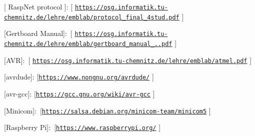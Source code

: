 \begin{DoxyItemize}
\item \mbox{[} Rasp\+Net protocol \mbox{]}\+: \mbox{[} \href{https://osg.informatik.tu-chemnitz.de/lehre/emblab/protocol_final_4stud.pdf}{\tt https\+://osg.\+informatik.\+tu-\/chemnitz.\+de/lehre/emblab/protocol\+\_\+final\+\_\+4stud.\+pdf} \mbox{]}
\item \mbox{[}Gertboard Manual\mbox{]}\+: \mbox{[} \href{https://osg.informatik.tu-chemnitz.de/lehre/emblab/gertboard_manual_2.0.pdf}{\tt https\+://osg.\+informatik.\+tu-\/chemnitz.\+de/lehre/emblab/gertboard\+\_\+manual\+\_..\+pdf} \mbox{]}
\item \mbox{[}A\+VR\mbox{]}\+: \mbox{[} \href{https://osg.informatik.tu-chemnitz.de/lehre/emblab/atmel.pdf}{\tt https\+://osg.\+informatik.\+tu-\/chemnitz.\+de/lehre/emblab/atmel.\+pdf} \mbox{]}
\item \mbox{[}avrdude\mbox{]}\+: \mbox{[}\href{https://www.nongnu.org/avrdude/}{\tt https\+://www.\+nongnu.\+org/avrdude/} \mbox{]}
\item \mbox{[}avr-\/gcc\mbox{]}\+: \mbox{[}\href{https://gcc.gnu.org/wiki/avr-gcc}{\tt https\+://gcc.\+gnu.\+org/wiki/avr-\/gcc} \mbox{]}
\item \mbox{[}Minicom\mbox{]}\+: \mbox{[}\href{https://salsa.debian.org/minicom-team/minicom5}{\tt https\+://salsa.\+debian.\+org/minicom-\/team/minicom5} \mbox{]}
\item \mbox{[}Raspberry Pi\mbox{]}\+: \mbox{[}\href{https://www.raspberrypi.org/}{\tt https\+://www.\+raspberrypi.\+org/} \mbox{]} 
\end{DoxyItemize}